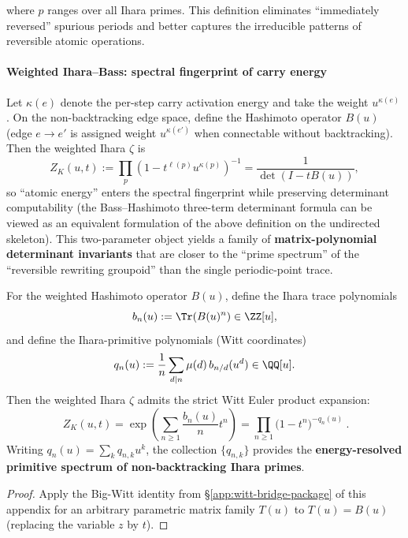 where $p$ ranges over all Ihara primes. This definition eliminates ``immediately reversed'' spurious periods and better captures the irreducible patterns of reversible atomic operations.

\paragraph{Weighted Ihara--Bass: spectral fingerprint of carry energy}
Let $\kappa(e)$ denote the per-step carry activation energy and take the weight $u^{\kappa(e)}$. On the non-backtracking edge space, define the Hashimoto operator $B(u)$ (edge $e\to e'$ is assigned weight $u^{\kappa(e')}$ when connectable without backtracking). Then the weighted Ihara \(\zeta\) is
\[
Z_K(u,t):=\prod_{p}\left(1-t^{\ell(p)}u^{\kappa(p)}\right)^{-1}
=\frac{1}{\det(I-tB(u))},
\]
so ``atomic energy'' enters the spectral fingerprint while preserving determinant computability (the Bass--Hashimoto three-term determinant formula can be viewed as an equivalent formulation of the above definition on the undirected skeleton). This two-parameter object yields a family of \textbf{matrix-polynomial determinant invariants} that are closer to the ``prime spectrum'' of the ``reversible rewriting groupoid'' than the single periodic-point trace.

\begin{proposition}\label{prop:ihara-witt-primitive-spectrum}
For the weighted Hashimoto operator \(B(u)\), define the Ihara trace polynomials
\[
b_n(u):=\Tr(B(u)^n)\in\ZZ[u],
\]
and define the Ihara-primitive polynomials (Witt coordinates)
\[
q_n(u):=\frac{1}{n}\sum_{d\mid n}\mu(d)\,b_{n/d}(u^d)\in\QQ[u].
\]
Then the weighted Ihara \(\zeta\) admits the strict Witt Euler product expansion:
\[
\boxed{\
Z_K(u,t)
=\exp\!\left(\sum_{n\ge 1}\frac{b_n(u)}{n}t^n\right)
=\prod_{n\ge 1}\bigl(1-t^n\bigr)^{-q_n(u)}
\ }.
\]
Writing \(q_n(u)=\sum_k q_{n,k}u^k\), the collection \(\{q_{n,k}\}\) provides the \textbf{energy-resolved primitive spectrum of non-backtracking Ihara primes}.
\end{proposition}
\begin{proof}
Apply the Big-Witt identity from \S\ref{app:witt-bridge-package} of this appendix for an arbitrary parametric matrix family \(T(u)\) to \(T(u)=B(u)\) (replacing the variable \(z\) by \(t\)). \qedhere
\end{proof}


